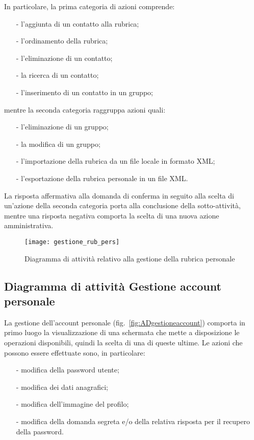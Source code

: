 In particolare, la prima categoria di azioni comprende:
\begin{itemize}[noitemsep,nolistsep]
  \item[-] l'aggiunta di un contatto alla rubrica;
  \item[-] l'ordinamento della rubrica;
  \item[-] l'eliminazione di un contatto;
  \item[-] la ricerca di un contatto;
  \item[-] l'inserimento di un contatto in un gruppo;
\end{itemize}
mentre la seconda categoria raggruppa azioni quali:
\begin{itemize}[noitemsep,nolistsep]
  \item[-] l'eliminazione di un gruppo;
  \item[-] la modifica di un gruppo;
  \item[-] l'importazione della rubrica da un file locale in formato XML;
  \item[-] l'esportazione della rubrica personale in un file XML.
\end{itemize}

La risposta affermativa alla domanda di conferma in seguito alla scelta di un'azione della seconda categoria porta alla conclusione della sotto-attività, mentre una risposta negativa comporta la scelta di una nuova azione amministrativa.

\begin{figure}[H]
\centering
\texttt{[image: gestione\_rub\_pers]}
\caption{Diagramma di attività relativo alla gestione della rubrica personale}\label{fig:ADgestionerubrica}
\end{figure}

\subsection{Diagramma di attività Gestione account personale}
La gestione dell'account personale (fig.~\vref{fig:ADgestioneaccount}) comporta in primo luogo la visualizzazione di una schermata che mette a disposizione le operazioni disponibili, quindi la scelta di una di queste ultime. Le azioni che possono essere effettuate sono, in particolare:
\begin{itemize}[noitemsep,nolistsep]
  \item[-] modifica della password utente;
  \item[-] modifica dei dati anagrafici;
  \item[-] modifica dell'immagine del profilo;
  \item[-] modifica della domanda segreta e/o della relativa risposta per il recupero della password.
\end{itemize}

